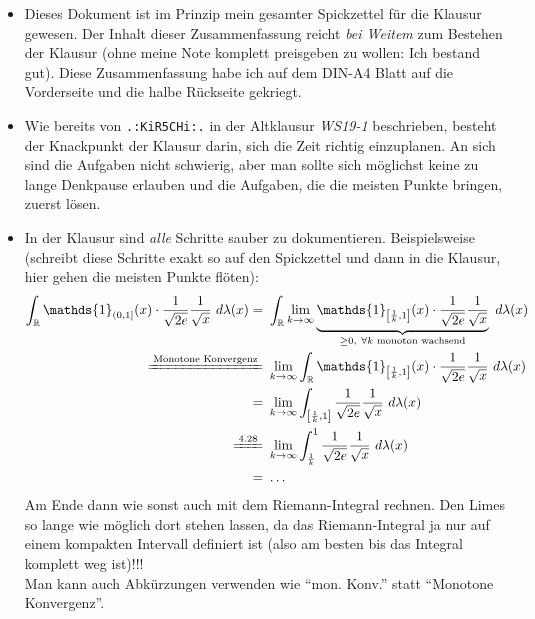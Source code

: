 \begin{itemize}
	\item Dieses Dokument ist im Prinzip mein gesamter Spickzettel für die Klausur gewesen. Der Inhalt dieser Zusammenfassung reicht \emph{bei Weitem} zum Bestehen der Klausur (ohne meine Note komplett preisgeben zu wollen: Ich bestand gut). Diese Zusammenfassung habe ich auf dem DIN-A4 Blatt auf die Vorderseite und die halbe Rückseite gekriegt.

	\item Wie bereits von \texttt{.:KiR5CHi:.} in der Altklausur \emph{WS19-1} beschrieben, besteht der Knackpunkt der Klausur darin, sich die Zeit richtig einzuplanen. An sich sind die Aufgaben nicht schwierig, aber man sollte sich möglichst keine zu lange Denkpause erlauben und die Aufgaben, die die meisten Punkte bringen, zuerst lösen.

	\item In der Klausur sind \emph{alle} Schritte sauber zu dokumentieren. Beispielsweise (schreibt diese Schritte exakt so auf den Spickzettel und dann in die Klausur, hier gehen die meisten Punkte flöten):
	\begin{align*}
		\int_{\R} \mathds{1}_{(0,1]}(x)\cdot\frac{1}{\sqrt{2e}}\frac{1}{\sqrt{x}}~d\lambda(x)=\ &\int_{\R} \limfty{k}\underbrace{\mathds{1}_{\left[\frac{1}{k},1\right]}(x)\cdot\frac{1}{\sqrt{2e}}\frac{1}{\sqrt{x}}}_{\geq 0,~\forall k \text{ monoton wachsend}}~d\lambda(x)\\
		\xlongequal{\text{Monotone Konvergenz}}\ &\limfty{k}\int_{\R}\mathds{1}_{\left[\frac{1}{k},1\right]}(x)\cdot\frac{1}{\sqrt{2e}}\frac{1}{\sqrt{x}}~d\lambda(x)\\
		=\ &\limfty{k}\int_{\left[\frac{1}{k},1\right]}\frac{1}{\sqrt{2e}}\frac{1}{\sqrt{x}}~d\lambda(x)\\
		\xlongequal{\text{4.28}}\ &\limfty{k}\int_{\frac{1}{k}}^1 \frac{1}{\sqrt{2e}}\frac{1}{\sqrt{x}}~d\lambda(x)\\
		=\ &\ldots
	\end{align*}
	Am Ende dann wie sonst auch mit dem Riemann-Integral rechnen. Den Limes so lange wie möglich dort stehen lassen, da das Riemann-Integral ja nur auf einem kompakten Intervall definiert ist (also am besten bis das Integral komplett weg ist)!!!\\
    Man kann auch Abkürzungen verwenden wie ``mon. Konv.'' statt ``Monotone Konvergenz''.
\end{itemize}
